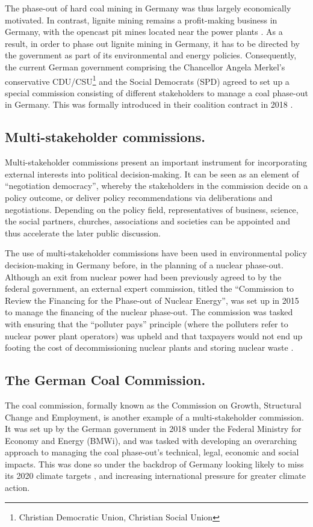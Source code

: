 \documentclass[12pt,onecolumn,twoside]{layout}
\begin{document}
The phase-out of hard coal mining in Germany was thus largely economically motivated. In contrast, lignite mining remains a profit-making business in Germany, with the opencast pit mines located near the power plants \citep{Appunn2019}. As a result, in order to phase out lignite mining in Germany, it has to be directed by the government as part of its environmental and energy policies. Consequently, the current German government comprising the Chancellor Angela Merkel's conservative CDU/CSU\footnote{Christian Democratic Union, Christian Social Union} and the Social Democrats (SPD) agreed to set up a special commission consisting of different stakeholders to manage a coal phase-out in Germany. This was formally introduced in their coalition contract in 2018 \citep{Wehrmann2018}.

\subsection*{Multi-stakeholder commissions.}
Multi-stakeholder commissions present an important instrument for incorporating external interests into political decision-making. It can be seen as an element of ``negotiation democracy'', whereby the stakeholders in the commission decide on a policy outcome, or deliver policy recommendations via deliberations and negotiations. Depending on the policy field, representatives of business, science, the social partners, churches, associations and societies can be appointed and thus accelerate the later public discussion. \citep{Siefken2016}

The use of multi-stakeholder commissions have been used in environmental policy decision-making in Germany before, in the planning of a nuclear phase-out. Although an exit from nuclear power had been previously agreed to by the federal government, an external expert commission, titled the ``Commission to Review the Financing for the Phase-out of Nuclear Energy'', was set up in 2015 to manage the financing of the nuclear phase-out. The commission was tasked with ensuring that the ``polluter pays'' principle (where the polluters refer to nuclear power plant operators) was upheld and that taxpayers would not end up footing the cost of decommissioning nuclear plants and storing nuclear waste \citep{Appunn2017}.

\subsection*{The German Coal Commission.}
The coal commission, formally known as the Commission on Growth, Structural Change and Employment, is another example of a multi-stakeholder commission. It was set up by the German government in 2018 under the Federal Ministry for Economy and Energy (BMWi), and was tasked with developing an overarching approach to managing the coal phase-out’s technical, legal, economic and social impacts. This was done so under the backdrop of Germany looking likely to miss its 2020 climate targets \citep{der2017projektionsbericht}, and increasing international pressure for greater climate action.
\end{document}
